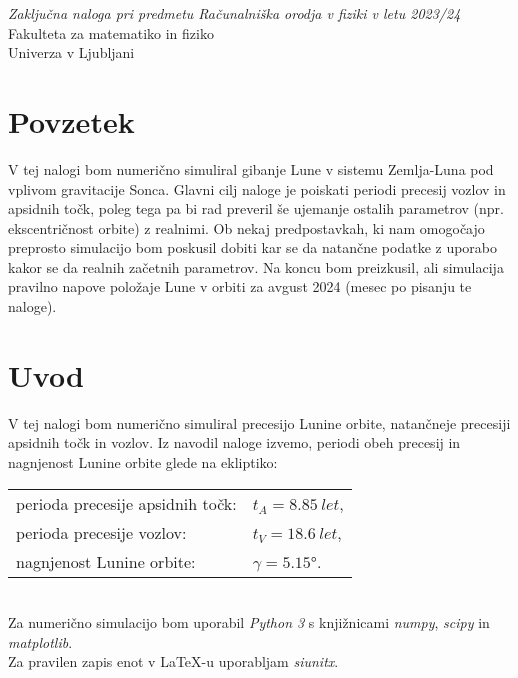 \documentclass{article}
\begin{document}
\vspace{0.45\textwidth}
\begin{center}
    \textit{\large Zaključna naloga pri predmetu Računalniška orodja v fiziki v letu 2023/24}\\
    \vspace{0.62\textwidth}
    \large Fakulteta za matematiko in fiziko\\
    Univerza v Ljubljani\\
\end{center}
\newpage

\setcounter{page}{1}
\section*{Povzetek}
V tej nalogi bom numerično simuliral gibanje Lune v sistemu Zemlja-Luna pod vplivom gravitacije Sonca. Glavni cilj naloge je poiskati periodi precesij vozlov in apsidnih točk, poleg tega pa bi rad preveril še ujemanje ostalih parametrov (npr. ekscentričnost orbite) z realnimi. Ob nekaj predpostavkah, ki nam omogočajo preprosto simulacijo bom poskusil dobiti kar se da natančne podatke z uporabo kakor se da realnih začetnih parametrov. Na koncu bom preizkusil, ali simulacija pravilno napove položaje Lune v orbiti za avgust 2024 (mesec po pisanju te naloge).

\newpage
\thispagestyle{fancy}
\tableofcontents
\thispagestyle{fancy}
\newpage
{}

\section{Uvod}
V tej nalogi bom numerično simuliral precesijo Lunine orbite, natančneje precesiji apsidnih točk in vozlov. Iz navodil naloge izvemo, periodi obeh precesij in nagnjenost Lunine orbite glede na ekliptiko:

\begin{tabular}{@{$\bullet$\quad}ll}
    perioda precesije apsidnih točk: & $t_A=\SI{8,85}{let}$,\\
    perioda precesije vozlov: & $t_V=\SI{18,6}{let}$,\\
    nagnjenost Lunine orbite: & $\gamma=\ang{5,15}$.
\end{tabular}\\
Za numerično simulacijo bom uporabil \textit{Python 3} s knjižnicami \textit{numpy}, \textit{scipy} in \textit{matplotlib}.
\\Za pravilen zapis enot v \LaTeX-u uporabljam \textit{siunitx}.
\end{document}
